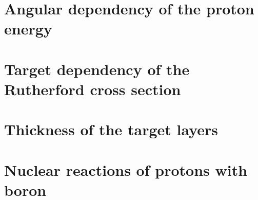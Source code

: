 \section{Angular dependency of the proton energy}

\section{Target dependency of the Rutherford cross section}

\section{Thickness of the target layers} 

\section{Nuclear reactions of protons with boron}

